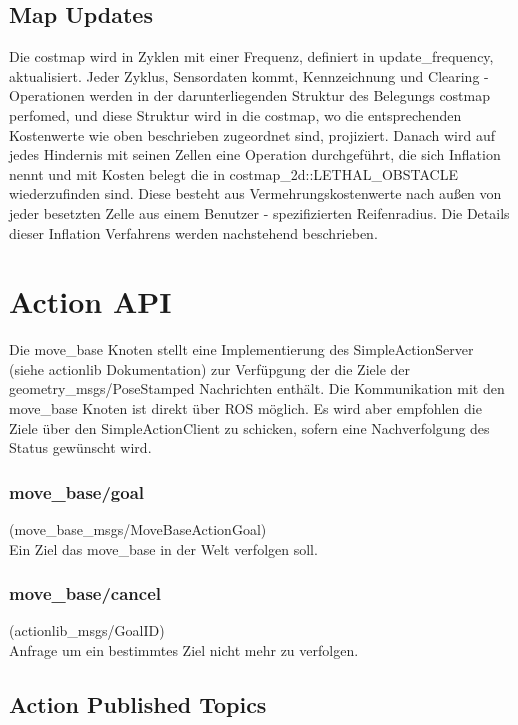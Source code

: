 \documentclass[oribibl]{llncs}
\begin{document}
\subsection{Map Updates}
Die costmap wird in Zyklen mit einer Frequenz, definiert in update\_frequency, aktualisiert. Jeder Zyklus, Sensordaten kommt, Kennzeichnung und Clearing -Operationen werden in der darunterliegenden Struktur des Belegungs costmap perfomed, und diese Struktur wird in die costmap, wo die entsprechenden Kostenwerte wie oben beschrieben zugeordnet sind, projiziert. Danach wird auf jedes Hindernis mit seinen Zellen eine Operation durchgeführt, die sich Inflation nennt und mit Kosten belegt die in costmap\_2d::LETHAL\_OBSTACLE wiederzufinden sind. Diese besteht aus Vermehrungskostenwerte nach außen von jeder besetzten Zelle aus einem Benutzer - spezifizierten Reifenradius. Die Details dieser Inflation Verfahrens werden nachstehend beschrieben.

\section{Action API}
Die move\_base Knoten stellt eine Implementierung des SimpleActionServer (siehe actionlib Dokumentation) zur Verfüpgung der die Ziele der geometry\_msgs/PoseStamped Nachrichten enthält. Die Kommunikation mit den move\_base Knoten ist direkt über ROS möglich. Es wird aber empfohlen die Ziele über den SimpleActionClient zu schicken, sofern eine Nachverfolgung des Status gewünscht wird.
\subsubsection{move\_base/goal} (move\_base\_msgs/MoveBaseActionGoal)\\
	Ein Ziel das move\_base in der Welt verfolgen soll.
\subsubsection{move\_base/cancel} (actionlib\_msgs/GoalID)\\
	Anfrage um ein bestimmtes Ziel nicht mehr zu verfolgen.
\subsection{Action Published Topics}
\end{document}
